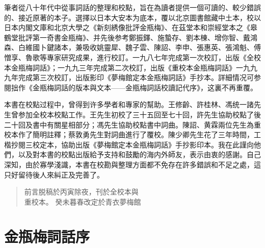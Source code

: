 筆者從八十年代中從事詞話的整理和校點，旨在為讀者提供一個可讀的、較少錯誤的、接近原著的本子。選擇以日本大安本为底本，覆以北京圖書館藏中土本，校以日本内閣文庫和北京大學之《新刻綉像批評金瓶梅》、在茲堂本和崇經堂本之《皋鶴堂批評第一奇書金瓶梅》、并先後参考鄭振鐸、施蟄存、劉本棟、增你智、戴鴻森、白維國卜鍵諸本，兼吸收姚靈犀、魏子雲、陳詔、李申、張惠英、張鴻魁、傅憎享、魯歌等專家研究成果，進行校訂。一九八七年完成第一次校訂，出版《全校本金瓶梅詞話》；一九九三年完成第二次校訂，出版《重校本金瓶梅詞話》一九九九年完成第三次校訂，出版影印《夢梅館定本金瓶梅詞話》手抄本。詳細情况可参閱拙作《金瓶梅詞話的版本與文本——金瓶梅詞話校讀記代序》，这裏不再重覆。

本書在校點过程中，曾得到许多學者和專家的幫助。王修齡、許桂林、馮统一諸先生曾参加全校本校點工作。王先生初校了三十五回至七十回，許先生協助校點了後二十回及書中有關星相部分；馮先生協助校點書中詞曲。陳詔、黄霖兩位先生為重校本作了簡明註釋；蔡敦勇先生對詞曲進行了覆校。陳少卿先生花了三年時間，工楷抄閱三校定本，協助出版《夢梅館定本金瓶梅詞話》手抄影印本。我在此謹向他們，以及對本書的校點出版給予支持和鼓勵的海内外師友，表示由衷的感謝。自己深知，由於寡學淺識，本書在校勘與整理方面都不免存在許多錯誤和不足之處，這只好留待後人來糾正及完善了。

\begin{quotation}
\begin{flushright}

\nopagebreak 前言脱稿於丙寅除夜，刊於全校本與\\重校本。
癸未暮春改定於青衣夢梅館

\end{flushright}
\end{quotation}

\setcounter{footnote}{0}

\chapter*{金瓶梅詞話序}
\thispagestyle{empty}

